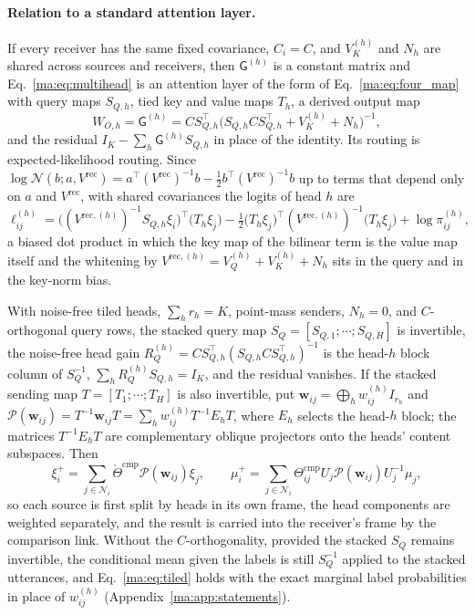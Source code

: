 \documentclass[11pt]{article}
\theoremstyle{definition}
\theoremstyle{remark}
\newcommand{\Nset}{\mathcal N}
\newcommand{\Gauss}{\mathcal N}
\newcommand{\Vrec}{V^{\mathrm{rec}}}
\newcommand{\G}{\mathsf G}
\newcommand{\Thr}{\mathring\Theta^{\mathrm{cmp}}}
\newcommand{\Thcmp}{\Theta^{\mathrm{cmp}}}
\begin{document}
\paragraph{Relation to a standard attention layer.}
If every receiver has the same fixed covariance, $C_i=C$, and $V^{(h)}_K$ and $N_h$ are shared across sources and receivers, then $\G^{(h)}$ is a constant matrix and Eq.~\eqref{ma:eq:multihead} is an attention layer of the form of Eq.~\eqref{ma:eq:four_map} with query maps $S_{Q,h}$, tied key and value maps $T_h$, a derived output map
\begin{equation}
W_{O,h}=\G^{(h)}=CS_{Q,h}^\top\bigl(S_{Q,h}CS_{Q,h}^\top+V^{(h)}_K+N_h\bigr)^{-1},
\label{ma:eq:derived_output}
\end{equation}
and the residual $I_K-\sum_h\G^{(h)}S_{Q,h}$ in place of the identity. Its routing is expected-likelihood routing. Since $\log\Gauss(b;a,\Vrec)=a^\top(\Vrec)^{-1}b-\frac12b^\top(\Vrec)^{-1}b$ up to terms that depend only on $a$ and $\Vrec$, with shared covariances the logits of head $h$ are
\begin{equation}
\ell^{(h)}_{ij}=\bigl((V^{\mathrm{rec},(h)})^{-1}S_{Q,h}\xi_i\bigr)^\top\bigl(T_h\xi_j\bigr)-\tfrac12\bigl(T_h\xi_j\bigr)^\top(V^{\mathrm{rec},(h)})^{-1}\bigl(T_h\xi_j\bigr)+\log\pi^{(h)}_{ij},
\label{ma:eq:logits}
\end{equation}
a biased dot product in which the key map of the bilinear term is the value map itself and the whitening by $V^{\mathrm{rec},(h)}=V^{(h)}_Q+V^{(h)}_K+N_h$ sits in the query and in the key-norm bias.

With noise-free tiled heads, $\sum_hr_h=K$, point-mass senders, $N_h=0$, and $C$-orthogonal query rows, the stacked query map $S_Q=[S_{Q,1};\cdots;S_{Q,H}]$ is invertible, the noise-free head gain $R^{(h)}_Q=CS_{Q,h}^\top(S_{Q,h}CS_{Q,h}^\top)^{-1}$ is the head-$h$ block column of $S_Q^{-1}$, $\sum_hR^{(h)}_QS_{Q,h}=I_K$, and the residual vanishes. If the stacked sending map $T=[T_1;\cdots;T_H]$ is also invertible, put $\boldsymbol w_{ij}=\bigoplus_hw^{(h)}_{ij}I_{r_h}$ and $\mathcal P(\boldsymbol w_{ij})=T^{-1}\boldsymbol w_{ij}T=\sum_hw^{(h)}_{ij}T^{-1}E_hT$, where $E_h$ selects the head-$h$ block; the matrices $T^{-1}E_hT$ are complementary oblique projectors onto the heads' content subspaces. Then
\begin{equation}
\xi_i^+=\sum_{j\in\Nset_i}\Thr\mathcal P(\boldsymbol w_{ij})\xi_j,\qquad
\mu_i^+=\sum_{j\in\Nset_i}\Thcmp_{ij}U_j\mathcal P(\boldsymbol w_{ij})U_j^{-1}\mu_j,
\label{ma:eq:tiled}
\end{equation}
so each source is first split by heads in its own frame, the head components are weighted separately, and the result is carried into the receiver's frame by the comparison link. Without the $C$-orthogonality, provided the stacked $S_Q$ remains invertible, the conditional mean given the labels is still $S_Q^{-1}$ applied to the stacked utterances, and Eq.~\eqref{ma:eq:tiled} holds with the exact marginal label probabilities in place of $w^{(h)}_{ij}$ (Appendix~\ref{ma:app:statements}).
\end{document}
